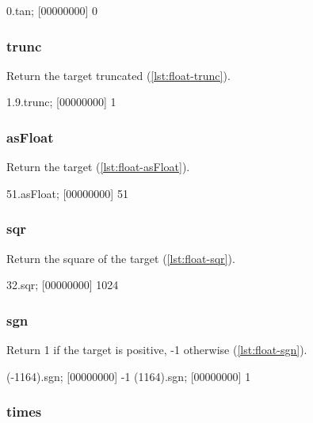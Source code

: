 \begin{urbiscript}[caption=Float.tan, label=lst:float-tan,
  float=\floatposh]
  0.tan;
  [00000000] 0
\end{urbiscript}

\subsubsection{trunc}

Return the target truncated  (\autoref{lst:float-trunc}).

\begin{urbiscript}[caption=Float.trunc, label=lst:float-trunc,
  float=\floatposh]
  1.9.trunc;
  [00000000] 1
\end{urbiscript}

\subsubsection{asFloat}

Return the target (\autoref{lst:float-asFloat}).

\begin{urbiscript}[caption=Float.asFloat, label=lst:float-asFloat,
  float=\floatposh]
  51.asFloat;
  [00000000] 51
\end{urbiscript}

\subsubsection{sqr}

Return the square of the target (\autoref{lst:float-sqr}).

\begin{urbiscript}[caption=Float.sqr, label=lst:float-sqr,
  float=\floatposh]
  32.sqr;
  [00000000] 1024
\end{urbiscript}

\subsubsection{sgn}

Return 1 if the target is positive, -1 otherwise (\autoref{lst:float-sgn}).

\begin{urbiscript}[caption=Float.sgn, label=lst:float-sgn,
  float=\floatposh]
  (-1164).sgn;
  [00000000] -1
  (1164).sgn;
  [00000000] 1
\end{urbiscript}

\subsubsection{times}

